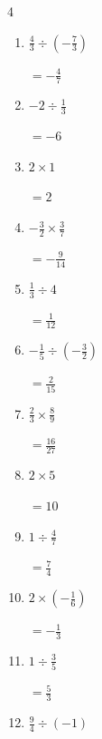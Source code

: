 \begin{multicols}{4}
\begin{enumerate}
        $\displaystyle =\frac{1}{6}$

  \item $\displaystyle \frac{4}{3}\div{}\left(-\frac{7}{3}\right)$

        $\displaystyle =-\frac{4}{7}$

  \item $\displaystyle -2\div{}\frac{1}{3}$

        $\displaystyle =-6$

  \item $\displaystyle 2\times{}1$

        $\displaystyle =2$

  \item $\displaystyle -\frac{3}{2}\times{}\frac{3}{7}$

        $\displaystyle =-\frac{9}{14}$

  \item $\displaystyle \frac{1}{3}\div{}4$

        $\displaystyle =\frac{1}{12}$

  \item $\displaystyle -\frac{1}{5}\div{}\left(-\frac{3}{2}\right)$

        $\displaystyle =\frac{2}{15}$

  \item $\displaystyle \frac{2}{3}\times{}\frac{8}{9}$

        $\displaystyle =\frac{16}{27}$

  \item $\displaystyle 2\times{}5$

        $\displaystyle =10$

  \item $\displaystyle 1\div{}\frac{4}{7}$

        $\displaystyle =\frac{7}{4}$

\columnbreak %

\resetques

  \item $\displaystyle 2\times{}\left(-\frac{1}{6}\right)$

        $\displaystyle =-\frac{1}{3}$

  \item $\displaystyle 1\div{}\frac{3}{5}$

        $\displaystyle =\frac{5}{3}$

  \item $\displaystyle \frac{9}{4}\div{}\left(-1\right)$


\end{enumerate}
\end{multicols}

